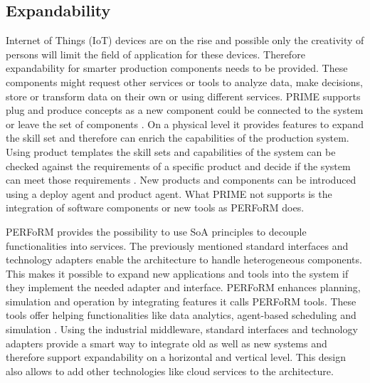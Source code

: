 \documentclass[conference,compsoc,hidelinks]{IEEEtran}
\begin{document}
\subsection{Expandability}
Internet of Things (IoT) devices are on the rise and possible only the creativity of persons will limit the field of application for these devices. Therefore expandability for smarter production components needs to be provided. These components might request other services or tools to analyze data, make decisions, store or transform data on their own or using different services. PRIME supports plug and produce concepts as a new component could be connected to the system or leave the set of components \cite{Hybrid}. On a physical level it provides features to expand the skill set and therefore can enrich the capabilities of the production system. Using product templates the skill sets and capabilities of the system can be checked against the requirements of a specific product and decide if the system can meet those requirements \cite{Hybrid}. New products and components can be introduced using a deploy agent and product agent. What PRIME not supports is the integration of software components or new tools as PERFoRM does.
 
PERFoRM provides the possibility to use SoA principles to decouple functionalities into services. The previously mentioned standard interfaces and technology adapters enable the architecture to handle heterogeneous components. This makes it possible to expand new applications and tools into the system if they implement the needed adapter and interface. 
PERFoRM enhances planning, simulation and operation by integrating features it calls PERFoRM tools. These tools offer helping functionalities like data analytics, agent-based scheduling and simulation \cite{SpecPERFoRM}.
Using the industrial middleware, standard interfaces and technology adapters provide a smart way to integrate old as well as new systems and therefore support expandability on a horizontal and vertical level. This design also allows to add other technologies like cloud services to the architecture.
\end{document}
